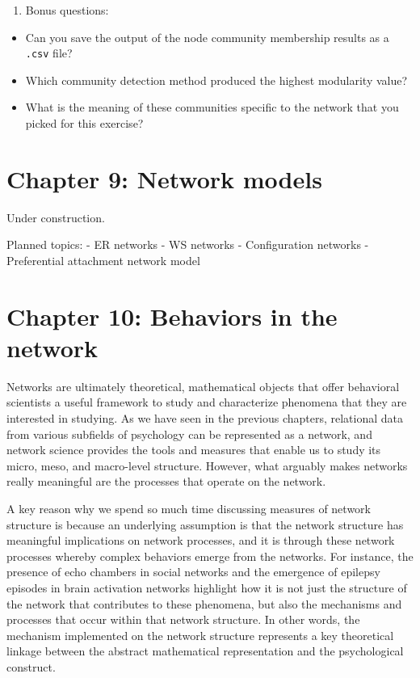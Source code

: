 \documentclass[
]{book}
\providecommand{\tightlist}{%
  \setlength{\itemsep}{0pt}\setlength{\parskip}{0pt}}
\begin{document}
\begin{enumerate}
\def\labelenumi{\arabic{enumi}.}
\setcounter{enumi}{2}
\tightlist
\item
  Bonus questions:
\end{enumerate}

\begin{itemize}
\tightlist
\item
  Can you save the output of the node community membership results as a \texttt{.csv} file?
\item
  Which community detection method produced the highest modularity value?
\item
  What is the meaning of these communities specific to the network that you picked for this exercise?
\end{itemize}

\chapter{Chapter 9: Network models}\label{ch9}

Under construction.

Planned topics:
- ER networks
- WS networks
- Configuration networks
- Preferential attachment network model

\chapter{Chapter 10: Behaviors in the network}\label{ch10}

Networks are ultimately theoretical, mathematical objects that offer behavioral scientists a useful framework to study and characterize phenomena that they are interested in studying. As we have seen in the previous chapters, relational data from various subfields of psychology can be represented as a network, and network science provides the tools and measures that enable us to study its micro, meso, and macro-level structure. However, what arguably makes networks really meaningful are the processes that operate on the network.

A key reason why we spend so much time discussing measures of network structure is because an underlying assumption is that the network structure has meaningful implications on network processes, and it is through these network processes whereby complex behaviors emerge from the networks. For instance, the presence of echo chambers in social networks and the emergence of epilepsy episodes in brain activation networks highlight how it is not just the structure of the network that contributes to these phenomena, but also the mechanisms and processes that occur within that network structure. In other words, the mechanism implemented on the network structure represents a key theoretical linkage between the abstract mathematical representation and the psychological construct.
\end{document}
